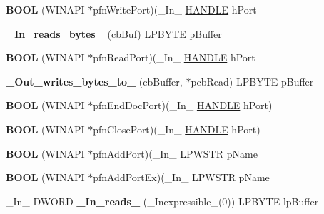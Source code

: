 \begin{DoxyCompactItemize}
{\bfseries B\+O\+OL} (W\+I\+N\+A\+PI $\ast$pfn\+Write\+Port)(\+\_\+\+In\+\_\+ \hyperlink{interfacevoid}{H\+A\+N\+D\+LE} h\+Port
\item 
\mbox{\label{struct___m_o_n_i_t_o_r_a0bdbfa8f20bbfbb2e023d64b0fc09809}} 
{\bfseries \+\_\+\+In\+\_\+reads\+\_\+bytes\+\_\+} (cb\+Buf) L\+P\+B\+Y\+TE p\+Buffer
\item 
\mbox{\label{struct___m_o_n_i_t_o_r_a78a9018a41762ff5a4d5b3faf9cb39e2}} 
{\bfseries B\+O\+OL} (W\+I\+N\+A\+PI $\ast$pfn\+Read\+Port)(\+\_\+\+In\+\_\+ \hyperlink{interfacevoid}{H\+A\+N\+D\+LE} h\+Port
\item 
\mbox{\label{struct___m_o_n_i_t_o_r_a5f29b0a58edc38dcc79f808011f027c7}} 
{\bfseries \+\_\+\+Out\+\_\+writes\+\_\+bytes\+\_\+to\+\_\+} (cb\+Buffer, $\ast$pcb\+Read) L\+P\+B\+Y\+TE p\+Buffer
\item 
\mbox{\label{struct___m_o_n_i_t_o_r_a54eafee5743347e98e17172680bb2128}} 
{\bfseries B\+O\+OL} (W\+I\+N\+A\+PI $\ast$pfn\+End\+Doc\+Port)(\+\_\+\+In\+\_\+ \hyperlink{interfacevoid}{H\+A\+N\+D\+LE} h\+Port)
\item 
\mbox{\label{struct___m_o_n_i_t_o_r_ab5ea81c06d6bbcadfc3466b0a2e77396}} 
{\bfseries B\+O\+OL} (W\+I\+N\+A\+PI $\ast$pfn\+Close\+Port)(\+\_\+\+In\+\_\+ \hyperlink{interfacevoid}{H\+A\+N\+D\+LE} h\+Port)
\item 
\mbox{\label{struct___m_o_n_i_t_o_r_a7c25ff7f75e8d5dbf6c06561ab509aa5}} 
{\bfseries B\+O\+OL} (W\+I\+N\+A\+PI $\ast$pfn\+Add\+Port)(\+\_\+\+In\+\_\+ L\+P\+W\+S\+TR p\+Name
\item 
\mbox{\label{struct___m_o_n_i_t_o_r_a488501311dad32440f67fed49fef8402}} 
{\bfseries B\+O\+OL} (W\+I\+N\+A\+PI $\ast$pfn\+Add\+Port\+Ex)(\+\_\+\+In\+\_\+ L\+P\+W\+S\+TR p\+Name
\item 
\mbox{\label{struct___m_o_n_i_t_o_r_a3529aa2cba4557f78964cd7296d22584}} 
\+\_\+\+In\+\_\+ D\+W\+O\+RD {\bfseries \+\_\+\+In\+\_\+reads\+\_\+} (\+\_\+\+Inexpressible\+\_\+(0)) L\+P\+B\+Y\+TE lp\+Buffer
\item 

\end{DoxyCompactItemize}
